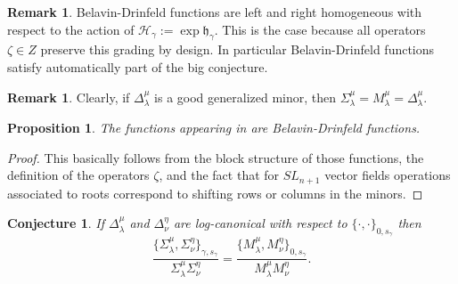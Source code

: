 \documentclass[a4paper]{amsart}
\newtheorem{proposition}[theorem]{Proposition}
\newtheorem{conjecture}[theorem]{Conjecture}
\theoremstyle{definition}
\newtheorem{remark}[theorem]{Remark}
\newcommand{\mfh}{\mathfrak{h}}
\newcommand{\mcH}{\mathcal{H}}
\begin{document}
\begin{remark}
  Belavin-Drinfeld functions are left and right homogeneous with respect to the action of $\mcH_\gamma:=\exp\mfh_\gamma$.
  This is the case because all operators $\zeta\in Z$ preserve this grading by design.
  In particular Belavin-Drinfeld functions satisfy automatically part of the big conjecture.
\end{remark}

\begin{remark}
  Clearly, if $\Delta_\lambda^\mu$ is a good generalized minor, then $\Sigma_\lambda^\mu=M_\lambda^\mu=\Delta_\lambda^\mu$.
\end{remark}

\begin{proposition}
  The functions appearing in \cite{GSV19} are Belavin-Drinfeld functions.
\end{proposition}
\begin{proof}
  This basically follows from the block structure of those functions, the definition of the operators $\zeta$, and the fact that for $SL_{n+1}$ vector fields operations associated to roots correspond to shifting rows or columns in the minors. 
\end{proof}

\begin{conjecture}
  If $\Delta_\lambda^\mu$ and $\Delta_\nu^\eta$ are log-canonical with respect to $\{\cdot,\cdot\}_{0,s_\gamma}$ then
  \[
    \frac{\{\Sigma_\lambda^\mu,\Sigma_\nu^\eta\}_{\gamma,s_\gamma}}{\Sigma_\lambda^\mu \Sigma_\nu^\eta} 
    = 
    \frac{\{M_\lambda^\mu,M_\nu^\eta\}_{0,s_\gamma}}{M_\lambda^\mu M_\nu^\eta}.
  \]
\end{conjecture}
\end{document}
